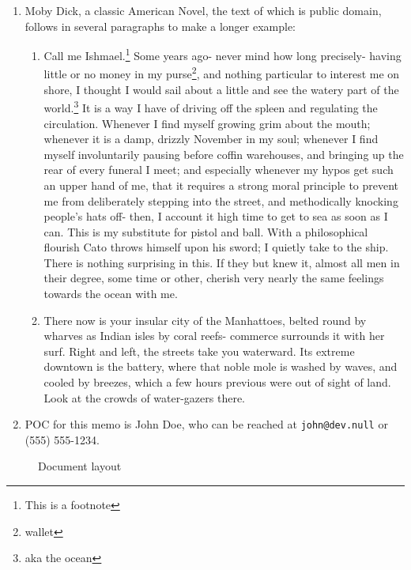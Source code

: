 \documentclass{../armymemo}
\begin{document}
\begin{enumerate}
	\item Moby Dick, a classic American Novel, the text of which is public domain,
	      follows in several paragraphs to make a longer example:
	      \begin{enumerate}
		      \item Call me Ishmael.\footnote{This is a footnote} Some years ago- never mind
		            how long precisely- having little or no money in my purse\footnote{wallet},
		            and nothing particular to interest me on shore, I thought I would sail about
		            a little and see the watery part of the world.\footnote{aka the ocean} It is
		            a way I have of driving off the spleen and regulating the
		            circulation. Whenever I find myself growing grim about the mouth; whenever
		            it is a damp, drizzly November in my soul; whenever I find myself
		            involuntarily pausing before coffin warehouses, and bringing up the rear of
		            every funeral I meet; and especially whenever my hypos get such an upper
		            hand of me, that it requires a strong moral principle to prevent me from
		            deliberately stepping into the street, and methodically knocking people's
		            hats off- then, I account it high time to get to sea as soon as I can.  This
		            is my substitute for pistol and ball. With a philosophical flourish Cato
		            throws himself upon his sword; I quietly take to the ship. There is nothing
		            surprising in this. If they but knew it, almost all men in their degree,
		            some time or other, cherish very nearly the same feelings towards the ocean
		            with me.

		      \item There now is your insular city of the Manhattoes, belted round by wharves as
		            Indian isles by coral reefs- commerce surrounds it with her surf. Right and
		            left, the streets take you waterward. Its extreme downtown is the battery, where
		            that noble mole is washed by waves, and cooled by breezes, which a few hours
		            previous were out of sight of land. Look at the crowds of water-gazers there.

	      \end{enumerate}

	\item POC for this memo is John Doe, who can be reached at \texttt{john@dev.null}
	      or (555) 555-1234.
\end{enumerate}

\begin{figure}
	\centering
	\currentpage
	\drawmarginparsfalse
	\drawdimensionstrue
	\pagedesign
	\caption{Document layout}
	\label{fig:1}
\end{figure}
\end{document}
